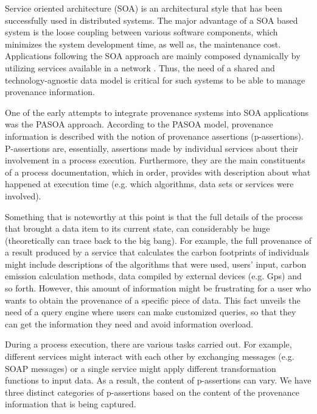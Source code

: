 Service oriented architecture (SOA) is an architectural style that has been successfully used in distributed systems. The major advantage of a SOA based system is the loose coupling between various software components, which minimizes the system development time, as well as, the maintenance cost. Applications following the SOA approach are mainly composed dynamically by utilizing services available in a network\cite{soa} . Thus, the need of a shared and technology-agnostic data model is critical for such systems to be able to manage provenance information.

One of the early attempts to integrate provenance systems into SOA applications was the PASOA approach\cite{reference32}. According to the PASOA model, provenance information is described with the notion of provenance assertions (p-assertions)\cite{reference9}. P-assertions are, essentially, assertions made by individual services about their involvement in a process execution. Furthermore, they are the main constituents of a process documentation, which in order, provides with description about what happened at execution time (e.g. which algorithms, data sets or services were involved).

Something that is noteworthy at this point is that the full details of the process that brought a data item to its current state, can considerably be huge (theoretically can trace back to the big bang\cite{reference1}). For example, the full provenance of a result produced by a service that calculates the carbon footprints of individuals might include descriptions of the algorithms that were used, users' input, carbon emission calculation methods, data compiled by external devices (e.g. Gps) and so forth. However, this amount of information might be frustrating for a user who wants to obtain the provenance of a specific piece of data. This fact unveils the need of a query engine where users can make customized queries, so that they can get the information they need and avoid information overload.

During a process execution, there are various tasks carried out. For example, different services might interact with each other by exchanging messages (e.g. SOAP messages) or a single service might apply different transformation functions to input data. As a result, the content of p-assertions can vary. We have three distinct categories of p-assertions based on the content of the provenance information that is being captured.

